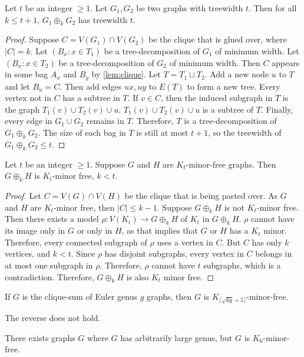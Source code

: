 \begin{proposition}
	Let $t$ be an integer $\geq 1$. Let $G_1, G_2$ be two graphs with treewidth $t$. Then for all $k \leq t + 1$, $G_1 \oplus_k G_2$ has treewidth $t$. 
\end{proposition}
\begin{proof}
	Suppose $C = V(G_1) \cap V(G_2)$ be the clique that is glued over, where $|C| = k$. Let $(B_x: x \in T_1)$ be a tree-decomposition of $G_1$ of minimum width. Let $(B_x : x \in T_2)$ be a tree-decomposition of $G_2$ of minimum width. Then $C$ appears in some bag $A_x$ and $B_y$ by \cref{lem:clique}. Let $T = T_1 \sqcup T_2$. Add a new node $u$ to $T$ and let $B_u = C$. Then add edges $ux, uy$ to $E(T)$ to form a new tree. Every vertex not in $C$ has a subtree in $T$. If $v \in C$, then the induced subgraph in $T$ is the graph $T_1(v) \cup T_2(v) \cup u$. $T_1(v) \cup T_2(v) \cup u$ is a subtree of $T$. Finally, every edge in $G_1 \cup G_2$ remains in $T$. Therefore, $T$ is a tree-decomposition of $G_1 \oplus_k G_2$. The size of each bag in $T$ is still at most $t + 1$, so the treewidth of $G_1 \oplus_k G_2 \leq t$.
\end{proof}

\begin{proposition}
	Let $t$ be an integer $\geq 1$. Suppose $G$ and $H$ are $K_t$-minor-free graphs. Then $G \oplus_k H$ is $K_{t}$-minor free, $k < t$.  
\end{proposition}
\begin{proof}
	Let $C = V(G) \cap V(H)$ be the clique that is being pasted over. As $G$ and $H$ are $K_t$-minor free, then $|C| \leq k - 1$. Suppose $G \oplus_k H$ is not $K_t$-minor free. Then there exists a model $\rho: V(K_t) \rightarrow G\oplus_k H$ of $K_t$ in $G \oplus_k H$. $\rho$ cannot have its image only in $G$ or only in $H$, as that implies that $G$ or $H$ has a $K_t$ minor. Therefore, every connected subgraph of $\rho$ uses a vertex in $C$. But $C$ has only $k$ vertices, and $k < t$. Since $\rho$ has disjoint subgraphs, every vertex in $C$ belongs in at most one subgraph in $\rho$. Therefore, $\rho$ cannot have $t$ subgraphs, which is a contradiction. Therefore, $G \oplus_k H$ is also $K_t$ minor free. 
\end{proof}

\begin{corollary}\label{corr:clique_sum_genus}
	If \(G\) is the clique-sum of Euler genus \(g\) graphs, then \(G\) is \(K_{\lceil \sqrt{6g} + 5 \rceil}\)-minor-free.
\end{corollary}
The reverse does not hold. 
\begin{proposition}
	There exists graphs $G$ where \(G\) has arbitrarily large genus, but $G$ is \(K_{6}\)-minor-free.
\end{proposition}

